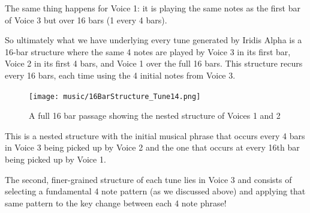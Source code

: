 The same thing happens for Voice 1: it is playing the same notes as the first bar of Voice 3 but over 16 bars (1 every 4 bars).

So ultimately what we have underlying every tune generated by Iridis Alpha is a 16-bar structure where the same 4 notes
are played by Voice 3 in its first bar, Voice 2 in its first 4 bars, and Voice 1 over the full 16 bars. This structure recurs every
16 bars, each time using the 4 initial notes from Voice 3.

\begin{figure}[H]
{
  \begin{adjustbox}{width=11cm,center}
  \texttt{[image: music/16BarStructure\_Tune14.png]}%
    \end{adjustbox}
}\caption[]{A full 16 bar passage showing the nested structure of Voices 1 and 2}
\end{figure}

This is a nested structure with the initial musical phrase that occurs every 4 bars in Voice 3 being picked up by Voice 2 and the one
that occurs at every 16th bar being picked up by Voice 1.

The second, finer-grained structure of each tune lies in Voice 3 and consists of selecting a fundamental 4 note pattern (as we 
discussed above) and applying that same pattern to the key change between each 4 note phrase! 

